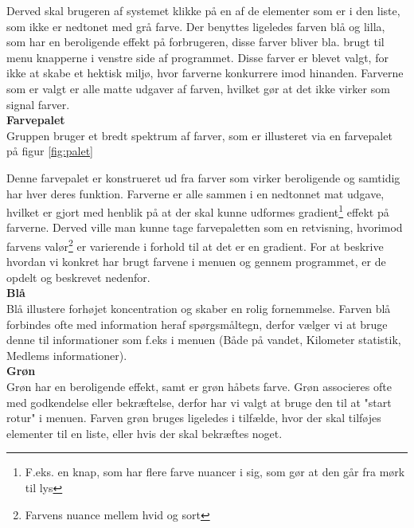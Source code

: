 
Derved skal brugeren af systemet klikke på en af de elementer som er i den liste, som ikke er nedtonet med grå farve. 
Der benyttes ligeledes farven blå og lilla, som har en beroligende effekt på forbrugeren, disse farver bliver bla. brugt til menu knapperne i venstre side af programmet. Disse farver er blevet valgt, for ikke at skabe et hektisk miljø, hvor farverne konkurrere imod hinanden. Farverne som er valgt er alle matte udgaver af farven, hvilket gør at det ikke virker som signal farver. \cite{psykologi-symbolik}\\

\textbf{Farvepalet}\\
Gruppen bruger et bredt spektrum af farver, som er illusteret via en farvepalet på figur \ref{fig:palet}


Denne farvepalet er konstrueret ud fra farver som virker beroligende og samtidig har hver deres funktion. Farverne er alle sammen i en nedtonnet mat udgave, hvilket er gjort med henblik på at der skal kunne udformes gradient\footnote{F.eks. en knap, som har flere farve nuancer i sig, som gør at den går fra mørk til lys} effekt på farverne. Derved ville man kunne tage farvepaletten som en retvisning, hvorimod farvens valør\footnote{Farvens nuance mellem hvid og sort} er varierende i forhold til at det er en gradient. For at beskrive hvordan vi konkret har brugt farvene i menuen og gennem programmet, er de opdelt og beskrevet nedenfor.\\

{\bf Blå}\\
Blå illustere forhøjet koncentration og skaber en rolig fornemmelse. Farven blå forbindes ofte med information heraf spørgsmåltegn, derfor vælger vi at bruge denne til informationer som f.eks i menuen (Både på vandet, Kilometer statistik, Medlems informationer).\\

{\bf Grøn}\\
Grøn har en beroligende effekt, samt er grøn håbets farve. Grøn associeres ofte med godkendelse eller bekræftelse, derfor har vi valgt at bruge den til at "start rotur" i menuen. Farven grøn bruges ligeledes i tilfælde, hvor der skal tilføjes elementer til en liste, eller hvis der skal bekræftes noget.\\

